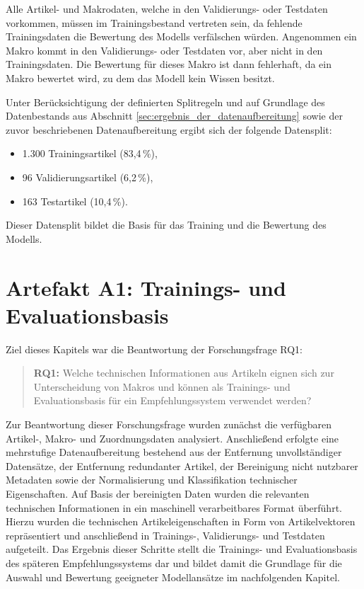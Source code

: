 Alle Artikel- und Makrodaten, welche in den Validierungs- oder Testdaten vorkommen, müssen im Trainingsbestand vertreten sein, da fehlende Trainingsdaten die Bewertung des Modells verfälschen würden. 
Angenommen ein Makro kommt in den Validierungs- oder Testdaten vor, aber nicht in den Trainingsdaten. Die Bewertung für dieses Makro ist dann fehlerhaft, da ein Makro bewertet wird, zu dem das Modell kein Wissen besitzt.

Unter Berücksichtigung der definierten Splitregeln und auf Grundlage des Datenbestands aus Abschnitt \ref{sec:ergebnis_der_datenaufbereitung} sowie der zuvor beschriebenen Datenaufbereitung ergibt sich der folgende Datensplit: 

\begin{itemize} 
\item 1.300 Trainingsartikel (83,4\,\%), 
\item 96 Validierungsartikel (6,2\,\%), 
\item 163 Testartikel (10,4\,\%). 
\end{itemize}

Dieser Datensplit bildet die Basis für das Training und die Bewertung des Modells.

\section{Artefakt A1: Trainings- und Evaluationsbasis} 

Ziel dieses Kapitels war die Beantwortung der Forschungsfrage RQ1: 

\begin{quote} 
    \textbf{RQ1:} Welche technischen Informationen aus Artikeln eignen sich zur Unterscheidung von Makros und können als Trainings- und Evaluationsbasis für ein Empfehlungssystem verwendet werden? 
\end{quote} 

Zur Beantwortung dieser Forschungsfrage wurden zunächst die verfügbaren Artikel-, Makro- und Zuordnungsdaten analysiert. 
Anschließend erfolgte eine mehrstufige Datenaufbereitung bestehend aus der Entfernung unvollständiger Datensätze, der Entfernung redundanter Artikel, 
der Bereinigung nicht nutzbarer Metadaten sowie der Normalisierung und Klassifikation technischer Eigenschaften. 
Auf Basis der bereinigten Daten wurden die relevanten technischen Informationen in ein maschinell verarbeitbares Format überführt. 
Hierzu wurden die technischen Artikeleigenschaften in Form von Artikelvektoren repräsentiert und anschließend in Trainings-, Validierungs- und Testdaten aufgeteilt. 
Das Ergebnis dieser Schritte stellt die Trainings- und Evaluationsbasis des späteren Empfehlungssystems dar und bildet damit die Grundlage für die Auswahl und Bewertung geeigneter Modellansätze im nachfolgenden Kapitel. 

